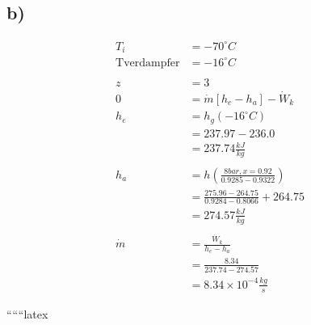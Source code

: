 

\subsection*{b)}

\begin{align*}
T_i &= -70^\circ C \\
\text{Tverdampfer} &= -16^\circ C \\
\\
z &= 3 \\
0 &= \dot{m} [h_e - h_a] - \dot{W}_k \\
h_e &= h_{g}(-16^\circ C) \\
&= 237.97 - 236.0 \\
&= 237.74 \frac{kJ}{kg} \\
\\
h_a &= h \left( \frac{8 bar, x=0.92}{0.9285 - 0.9322} \right) \\
&= \frac{275.96 - 264.75}{0.9284 - 0.8066} + 264.75 \\
&= 274.57 \frac{kJ}{kg} \\
\\
\dot{m} &= \frac{\dot{W}_k}{h_e - h_a} \\
&= \frac{8.34}{237.74 - 274.57} \\
&= 8.34 \times 10^{-4} \frac{kg}{s}
\end{align*}

``````latex